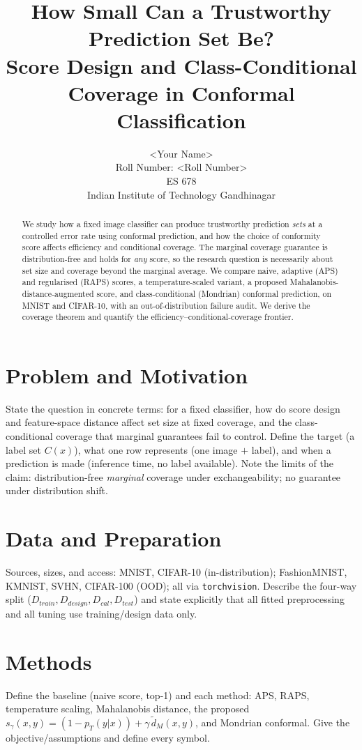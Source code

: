 \documentclass{article}
\title{How Small Can a Trustworthy Prediction Set Be?\\ Score Design and Class-Conditional Coverage in Conformal Classification}
\author{%
  <Your Name> \\
  Roll Number: <Roll Number> \\
  ES 678 \\
  Indian Institute of Technology Gandhinagar
}
\begin{document}
\maketitle

\begin{abstract}
We study how a fixed image classifier can produce trustworthy prediction \emph{sets} at a
controlled error rate using conformal prediction, and how the choice of conformity score affects
efficiency and conditional coverage. The marginal coverage guarantee is distribution-free and
holds for \emph{any} score, so the research question is necessarily about set size and coverage
beyond the marginal average. We compare naive, adaptive (APS) and regularised (RAPS) scores, a
temperature-scaled variant, a proposed Mahalanobis-distance-augmented score, and class-conditional
(Mondrian) conformal prediction, on MNIST and CIFAR-10, with an out-of-distribution failure audit.
We derive the coverage theorem and quantify the efficiency--conditional-coverage frontier.
\end{abstract}

\section{Problem and Motivation}
State the question in concrete terms: for a fixed classifier, how do score design and feature-space
distance affect set size at fixed coverage, and the class-conditional coverage that marginal
guarantees fail to control. Define the target (a label set $C(x)$), what one row represents (one
image $+$ label), and when a prediction is made (inference time, no label available). Note the
limits of the claim: distribution-free \emph{marginal} coverage under exchangeability; no guarantee
under distribution shift.

\section{Data and Preparation}
Sources, sizes, and access: MNIST, CIFAR-10 (in-distribution); FashionMNIST, KMNIST, SVHN,
CIFAR-100 (OOD); all via \texttt{torchvision}. Describe the four-way split
($D_{train}, D_{design}, D_{cal}, D_{test}$) and state explicitly that all fitted preprocessing and
all tuning use training/design data only.

\section{Methods}
Define the baseline (naive score, top-1) and each method: APS, RAPS, temperature scaling,
Mahalanobis distance, the proposed $s_\gamma(x,y) = (1 - p_T(y|x)) + \gamma\,\tilde d_M(x,y)$, and
Mondrian conformal. Give the objective/assumptions and define every symbol.
\end{document}
